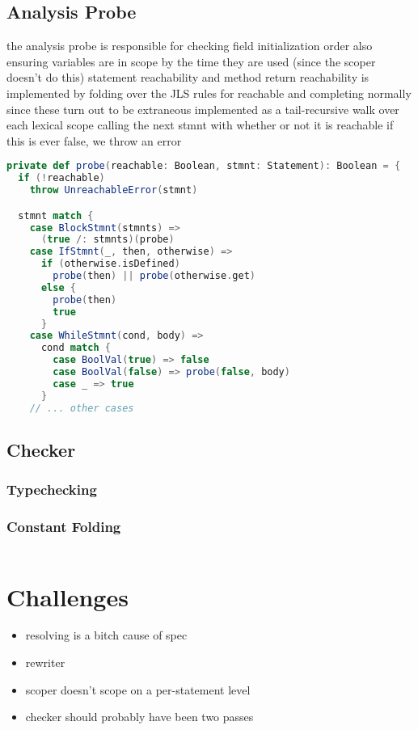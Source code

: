 \documentclass{article}
\begin{document}
\subsection{Analysis Probe}
the analysis probe is responsible for checking field initialization order
also ensuring variables are in scope by the time they are used
    (since the scoper doesn't do this)
statement reachability
and method return
reachability is implemented by folding over the JLS rules for reachable and completing normally
since these turn out to be extraneous
    implemented as a tail-recursive walk over each lexical scope
    calling the next stmnt with whether or not it is reachable
        if this is ever false, we throw an error

\begin{lstlisting}[language=Scala]
private def probe(reachable: Boolean, stmnt: Statement): Boolean = {
  if (!reachable)
    throw UnreachableError(stmnt)

  stmnt match {
    case BlockStmnt(stmnts) =>
      (true /: stmnts)(probe)
    case IfStmnt(_, then, otherwise) =>
      if (otherwise.isDefined)
        probe(then) || probe(otherwise.get)
      else {
        probe(then)
        true
      }
    case WhileStmnt(cond, body) =>
      cond match {
        case BoolVal(true) => false
        case BoolVal(false) => probe(false, body)
        case _ => true
      }
    // ... other cases
\end{lstlisting}



\subsection{Checker}
\subsubsection{Typechecking}
\subsubsection{Constant Folding}

\begin{lstlisting}[language=Scala]
\end{lstlisting}



\section{Challenges}
\begin{itemize}
    \item resolving is a bitch cause of spec
    \item rewriter
    \item scoper doesn't scope on a per-statement level
    \item checker should probably have been two passes
\end{itemize}
\end{document}
